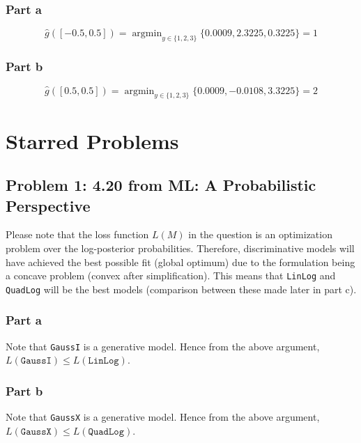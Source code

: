 \documentclass{article}
\newcommand{\argmin}{\mathop{\mathrm{argmin}}}
\begin{document}
\begin{flushleft}
\subsubsection*{Part a}
\begin{equation}
\hat{g}([-0.5, 0.5]) = \argmin_{y \in \{1, 2, 3\}} \{0.0009, 2.3225, 0.3225\} = 1
\end{equation}

\subsubsection*{Part b}
\begin{equation}
\hat{g}([0.5, 0.5]) = \argmin_{y \in \{1, 2, 3\}} \{0.0009, -0.0108, 3.3225\} = 2
\end{equation}
\end{flushleft}

\section*{Starred Problems}
\subsection*{Problem 1: 4.20 from ML: A Probabilistic Perspective}
Please note that the loss function \(L(M)\) in the question is an optimization problem over the log-posterior probabilities. Therefore, discriminative models will have achieved the best possible fit (global optimum) due to the formulation being a concave problem (convex after simplification). This means that \texttt{LinLog} and \texttt{QuadLog} will be the best models (comparison between these made later in part c).
\subsubsection*{Part a}
\begin{flushleft}
Note that \texttt{GaussI} is a generative model. Hence from the above argument, \(L(\texttt{GaussI}) \leq L(\texttt{LinLog})\).
\end{flushleft}

\subsubsection*{Part b}
\begin{flushleft}
Note that \texttt{GaussX} is a generative model. Hence from the above argument, \(L(\texttt{GaussX}) \leq L(\texttt{QuadLog})\).
\end{flushleft}
\end{document}
